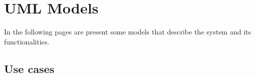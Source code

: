 %
%
\chapter{UML Models}
%
\label{cap:umlmodels}
In the following pages are present some models that describe the system and its functionalities.
%
%
\section{Use cases}
\begin{center}
\end{center}
